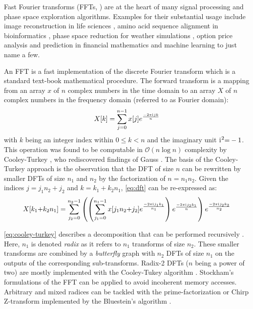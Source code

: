 Fast Fourier transforms (FFTs, \citep{van1992computational}) are at the heart of many signal processing and phase space exploration algorithms. Examples for their substantial usage include image reconstruction in life sciences \citep{preibisch2014efficient,schmid2015real}, amino acid sequence alignment in bioinformatics \citep{katoh2002mafft}, phase space reduction for weather simulations \citep{maronga2015parallelized}, option price analysis and prediction in financial mathematics \citep{hurd2010fourier} and machine learning \citep{dlstudy} to just name a few.

An FFT is a fast implementation of the discrete Fourier transform which is a standard text-book mathematical procedure. The forward transform is a mapping from an array $x$ of $n$ complex numbers in the time domain to an array $X$ of $n$ complex numbers in the frequency domain (referred to as Fourier domain):
%
\begin{equation}
  \label{eq:dft}
  X[k] = \sum_{j=0}^{n-1} x[j]e^{\frac{-2\pi {\mathrm{i}\mkern1mu} jk}{n}}
\end{equation}
%
with $k$ being an integer index within $0 \le k < n$ and the imaginary unit ${\mathrm{i}\mkern1mu}^2{=}-1$. This operation was found to be computable in $\mathcal{O}(n \log n)$ complexity by Cooley-Turkey \cite{cooley1965algorithm}, who rediscovered findings of Gauss \cite{gauss}. The basis of the Cooley-Turkey approach is the observation that the  DFT of size $n$ can be rewritten by smaller DFTs of size $n_1$ and $n_2$ by the factorization of $n=n_1n_2$. Given the indices $j{=}j_1n_2{+}j_2$ and $k{=}k_1{+}k_2n_1$, \cref{eq:dft} can be re-expressed as:
%
\begin{equation}
  \label{eq:cooley-turkey}
  X[k_1{+}k_2n_1] = \sum_{j_2=0}^{n_2-1} \left( \left( \sum_{j_1=0}^{n_1-1} x[j_1n_2{+}j_2] e^{\frac{-2\pi {\mathrm{i}\mkern1mu} j_1k_1}{n_1}} \right) e^{\frac{-2\pi {\mathrm{i}\mkern1mu} j_2k_1}{n}} \right) e^{\frac{-2\pi {\mathrm{i}\mkern1mu} j_2k_2}{n_2}}
\end{equation}

\cref{eq:cooley-turkey} describes a decomposition that can be performed recursively \cite{FFTW05}. Here, $n_1$ is denoted \emph{radix} as it refers to $n_1$ transforms of size $n_2$. These smaller transforms are combined by a \emph{butterfly} graph with $n_2$ DFTs of size $n_1$ on the outputs of the corresponding sub-transforms. Radix-2 DFTs ($n$ being a power of two) are mostly implemented with the Cooley-Tukey algorithm \cite{cooley1965algorithm}. Stockham's formulations of the FFT can be applied \cite{stockham1966high} to avoid incoherent memory accesses. Arbitrary and mixed radices can be tackled with the prime-factorization or Chirp Z-transform implemented by the Bluestein's algorithm \cite{bluestein}. 


